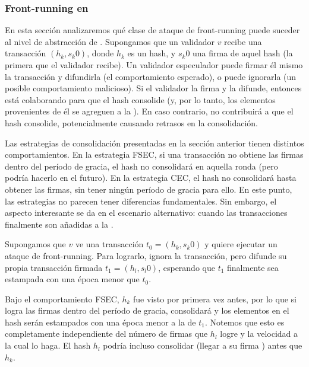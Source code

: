 \subsubsection{Front-running en \hashchain}
En esta sección analizaremos qué clase de ataque de front-running puede suceder al nivel de abstracción de \hashchain.
Supongamos que un validador $v$ recibe una transacción $(h_k, s_{k}0)$, donde $h_k$ es un hash,
y $s_{k}0$ una firma de aquel hash (la primera que el validador recibe).
Un validador especulador puede firmar él mismo la
transacción y difundirla (el comportamiento esperado), o puede ignorarla (un posible comportamiento
malicioso). Si el validador la firma y la difunde, entonces está colaborando para que el hash
consolide (y, por lo tanto, los elementos provenientes de él se agreguen a la  \setchain).
En caso contrario, no contribuirá a que el hash consolide, potencialmente causando retrasos
en la consolidación.
%

%
Las estrategias de consolidación presentadas en la sección anterior tienen distintos comportamientos.
En la estrategia FSEC, si una transacción no obtiene las \SPH firmas
dentro del período de gracia, el hash no consolidará en aquella ronda (pero podría hacerlo
en el futuro).
%
En la estrategia CEC, el hash no consolidará hasta obtener las \SPH firmas,
sin tener ningún período de gracia para ello.
%
En este punto, las estrategias no parecen tener diferencias fundamentales. Sin embargo, el aspecto
interesante se da en el escenario alternativo: cuando las transacciones finalmente son añadidas a la
\setchain.
%

Supongamos que $v$ ve una transacción $t_0 = (h_k, s_{k}0)$ y quiere ejecutar un ataque de front-running.
Para lograrlo, ignora la transacción, pero difunde su propia transacción firmada $t_1 = (h_l, s_{l}0)$,
esperando que $t_1$ finalmente sea estampada con una época menor que $t_0$.
%

Bajo el comportamiento FSEC, $h_k$ fue visto por primera vez antes, por lo que si logra las
\SPH firmas dentro del período de gracia, consolidará y los elementos
en el hash serán estampados con una época menor a la de $t_1$.
%
Notemos que esto es completamente independiente del número de firmas que $h_l$ logre y la velocidad
a la cual lo haga. El hash $h_l$ podría incluso consolidar (llegar a su firma \SPH)
antes que $h_k$.
%

